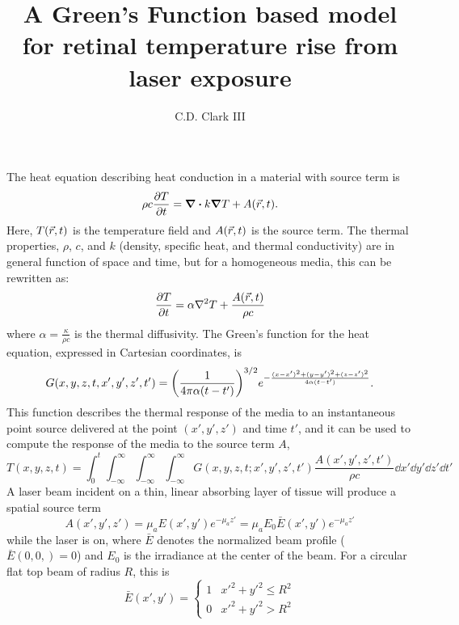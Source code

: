 \documentclass[]{article}
\author{C.D. Clark III}
\title{A Green's Function based model for retinal temperature rise from laser exposure}
\begin{document}
\maketitle

The heat equation describing heat conduction in a material with source term is
\begin{equation*}
    \rho c \pdv{T}{t} = \div{k\grad T} + A(\vec{r},t).
\end{equation*}
Here, $T\qty(\vec{r},t)$ is the temperature field and $A\qty(\vec{r},t)$ is the
source term. The thermal properties, $\rho$, $c$, and $k$ (density, specific
heat, and thermal conductivity) are in general function of space and time, but
for a homogeneous media, this can be rewritten as:
\begin{equation*}
    \pdv{T}{t} = \alpha\laplacian{T} + \frac{A(\vec{r},t)}{\rho c}
\end{equation*}
where $\alpha = \frac{\kappa}{\rho c }$ is the thermal diffusivity.
The Green's function for the heat equation, expressed in Cartesian coordinates, is
\begin{equation*}
    G(x,y,z,t,x',y',z',t') = \qty(\frac{1}{4\pi \alpha (t-t')})^{3/2} e^{-\frac{(x-x')^2+(y-y')^2+(z-z')^2}{4\alpha(t-t')}}.
\end{equation*}
This function describes the thermal response of the media to an instantaneous
point source delivered at the point $(x',y',z')$ and time $t'$, and it can
be used to compute the response of the media to the source term $A$,
\begin{equation*}
  T(x,y,z,t) = \int_0^t \int_{-\infty}^{\infty} \int_{-\infty}^{\infty} \int_{-\infty}^{\infty} G(x,y,z,t;x',y',z',t') \frac{A(x',y',z',t')}{\rho c} \dd x' \dd y' \dd z' \dd t'
\end{equation*}
A laser beam incident on a thin, linear absorbing layer of tissue will produce a spatial source term
\begin{equation*}
    A(x',y',z') = \mu_a E(x',y') e^{-\mu_a z'} = \mu_a E_0 \bar{E}(x',y') e^{-\mu_a z'}
\end{equation*}
while the laser is on,
where $\bar{E}$ denotes the normalized beam profile ($\bar{E}(0,0,) = 0$) and $E_0$ is the irradiance at the center of the beam.
For a circular flat top beam of radius $R$, this is
\begin{equation*}
    \bar{E}(x',y') = \begin{cases}
        1 & x'^2 + y'^2 \le R^2 \\
        0 & x'^2 + y'^2 > R^2
    \end{cases}
\end{equation*}
\end{document}
